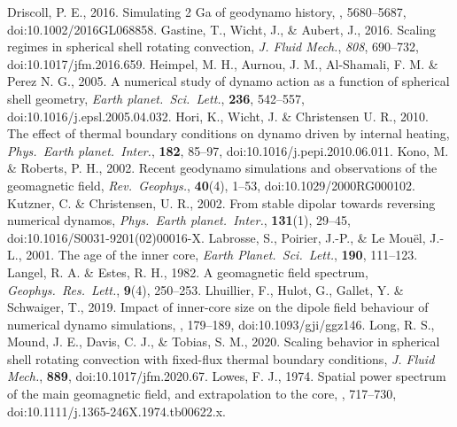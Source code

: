 \begin{thebibliography}{}
%
Driscoll, P. E., 2016. Simulating 2 Ga of geodynamo history, , 5680--5687, doi:10.1002/2016GL068858.
%
{\color{red}
Gastine, T., Wicht, J., \& Aubert, J., 2016. Scaling regimes in spherical shell rotating convection, {\it J. Fluid Mech.}, {\it 808}, 690--732, doi:10.1017/jfm.2016.659.
}
%
Heimpel, M. H., Aurnou, J. M., Al-Shamali, F. M. \& Perez N. G., 2005. A numerical study of dynamo action as a function of spherical shell geometry, {\it Earth planet.\ Sci.\ Lett.}, {\bf 236}, 542--557, doi:10.1016/j.epsl.2005.04.032.
%
Hori, K., Wicht, J. \& Christensen U. R., 2010. The effect of thermal boundary conditions on dynamo driven by internal heating, {\it Phys.\ Earth planet.\ Inter.}, {\bf 182}, 85--97, doi:10.1016/j.pepi.2010.06.011.
%
Kono, M. \& Roberts, P. H., 2002. Recent geodynamo simulations and observations of the geomagnetic field, {\it Rev.\ Geophys.}, {\bf 40}(4), 1--53, doi:10.1029/2000RG000102.
%
Kutzner, C. \& Christensen, U. R., 2002. From stable dipolar towards reversing numerical dynamos, {\it Phys.\ Earth planet.\ Inter.}, {\bf 131}(1), 29--45, doi:10.1016/S0031-9201(02)00016-X.
%
Labrosse, S., Poirier, J.-P., \& Le Mou{\"e}l, J.-L., 2001. The age of the inner core, {\it Earth Planet.\ Sci.\ Lett.}, {\bf 190}, 111--123.
%
Langel, R. A. \& Estes, R. H., 1982. A geomagnetic field spectrum, {\it Geophys.\ Res.\ Lett.}, {\bf 9}(4), 250--253.
%
Lhuillier, F., Hulot, G., Gallet, Y. \& Schwaiger, T., 2019. Impact of inner-core size on the dipole field behaviour of numerical dynamo simulations, , 179--189, doi:10.1093/gji/ggz146.
%
Long, R. S., Mound, J. E., Davis, C. J., \& Tobias, S. M., 2020. Scaling behavior in spherical shell rotating convection with fixed-flux thermal boundary conditions, {\it J. Fluid Mech.}, {\bf 889}, doi:10.1017/jfm.2020.67.
%
Lowes, F. J., 1974. Spatial power spectrum of the main geomagnetic field, and extrapolation to the core, , 717--730, doi:10.1111/j.1365-246X.1974.tb00622.x.

\end{thebibliography}
